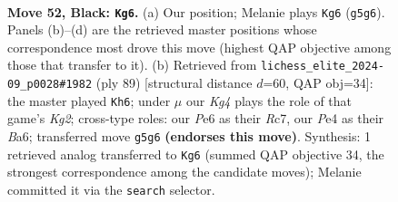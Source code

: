 \documentclass[11pt]{article}
\begin{document}
\clearpage

\begin{figure}[p]\centering
\begin{subfigure}{0.46\textwidth}\centering
\resizebox{\linewidth}{!}{%
\newchessgame
\chessboard[
  setfen={6r1/p7/1pr1p2p/n5k1/2P1p3/N4P2/P2BK1PR/2R5 b - - 1 52},
  showmover=false,
  pgfstyle=straightmove, color=movearrow, markmove={g5-g6}
]}
\caption{}
\end{subfigure}\hfill
\begin{subfigure}{0.46\textwidth}\centering
\resizebox{\linewidth}{!}{%
\newchessgame
\chessboard[
  setfen={8/p1r1r1k1/bp4p1/2nB3p/3RP2P/P3K1N1/2R3P1/8 b - - 28 45},
  showmover=false,
  pgfstyle=straightmove, color=movearrow, markmove={g7-h6}
]}
\caption{}
\end{subfigure}
\\[4pt]

\caption{\textbf{Move 52, Black: \texttt{Kg6}.} (a) Our position; Melanie plays \texttt{Kg6} (\texttt{g5g6}). Panels (b)--(d) are the retrieved master positions whose correspondence most drove this move (highest QAP objective among those that transfer to it). (b) Retrieved from \texttt{lichess\_elite\_2024-09\_p0028\#1982} (ply 89) [structural distance $d$=60, QAP obj=34]: the master played \texttt{Kh6}; under $\mu$ our \emph{Kg4} plays the role of that game's \emph{Kg2}; cross-type roles: our \emph{P}e6 as their \emph{R}c7, our \emph{P}e4 as their \emph{B}a6; transferred move \texttt{g5g6} \textbf{(endorses this move)}. Synthesis: 1 retrieved analog transferred to \texttt{Kg6} (summed QAP objective 34, the strongest correspondence among the candidate moves); Melanie committed it via the \texttt{search} selector.}
\label{fig:thought-m103}
\end{figure}

\clearpage
\end{document}
